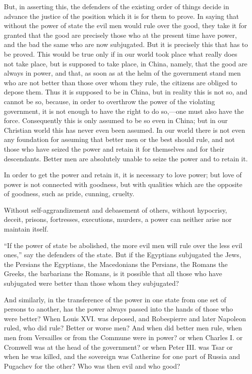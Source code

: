 \documentclass{book}
\begin{document}
But, in asserting this, the defenders of the existing order of things decide in advance the justice of the position which it is for them to prove. In saying that without the power of state the evil men would rule over the good, they take it for granted that the good are precisely those who at the present time have power, and the bad the same who are now subjugated. But it is precisely this that has to be proved. This would be true only if in our world took place what really does not take place, but is supposed to take place, in China, namely, that the good are always in power, and that, as soon as at the helm of the government stand men who are not better than those over whom they rule, the citizens are obliged to depose them. Thus it is supposed to be in China, but in reality this is not so, and cannot be so, because, in order to overthrow the power of the violating government, it is not enough to have the right to do so,—one must also have the force. Consequently this is only assumed to be so even in China; but in our Christian world this has never even been assumed. In our world there is not even any foundation for assuming that better men or the best should rule, and not those who have seized the power and retain it for themselves and for their descendants. Better men are absolutely unable to seize the power and to retain it.

In order to get the power and retain it, it is necessary to love power; but love of power is not connected with goodness, but with qualities which are the opposite of goodness, such as pride, cunning, cruelty.

Without self-aggrandizement and debasement of others, without hypocrisy, deceit, prisons, fortresses, executions, murders, a power can neither arise nor maintain itself.

“If the power of state be abolished, the more evil men will rule over the less evil ones,” say the defenders of the state. But if the Egyptians subjugated the Jews, the Persians the Egyptians, the Macedonians the Persians, the Romans the Greeks, the barbarians the Romans, is it possible that all those who have subjugated were better than those whom they subjugated?

And similarly, in the transference of the power in one state from one set of persons to another, has the power always passed into the hands of those who were better? When Louis XVI. was deposed, and Robespierre and later Napoleon ruled, who did rule? Better or worse men? And when did better men rule, when men from Versailles or from the Commune were in power? or when Charles I. or Cromwell was at the head of the government? or when Peter III. was Tsar or when he was killed, and the sovereign was Catherine for one part of Russia and Pugachev for the other? Who was then evil and who good?
\end{document}
